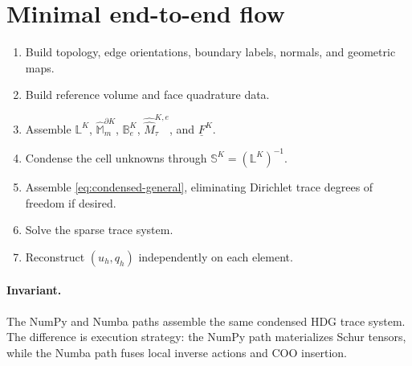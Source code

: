 \documentclass[11pt]{article}
\newcommand{\FK}{\underline F^K}
\newcommand{\LK}{\mathbb L^K}
\newcommand{\SK}{\mathbb S^K}
\newcommand{\B}{\mathbb B}
\newcommand{\Mbb}{\widehat{\mathbb M}}
\newcommand{\Mhh}{\widehat{\widehat M}}
\begin{document}
\section{Minimal end-to-end flow}

\begin{enumerate}[leftmargin=2em]
    \item Build topology, edge orientations, boundary labels, normals, and geometric maps.
    \item Build reference volume and face quadrature data.
    \item Assemble $\LK$, $\Mbb_m^{\partial K}$, $\B_e^K$, $\Mhh_\tau^{K,e}$, and $\FK$.
    \item Condense the cell unknowns through $\SK=(\LK)^{-1}$.
    \item Assemble \eqref{eq:condensed-general}, eliminating Dirichlet trace degrees of freedom if desired.
    \item Solve the sparse trace system.
    \item Reconstruct $(u_h,q_h)$ independently on each element.
\end{enumerate}

\paragraph{Invariant.}
The NumPy and Numba paths assemble the same condensed HDG trace system. The difference is execution strategy: the NumPy path materializes Schur tensors, while the Numba path fuses local inverse actions and COO insertion.
\end{document}
